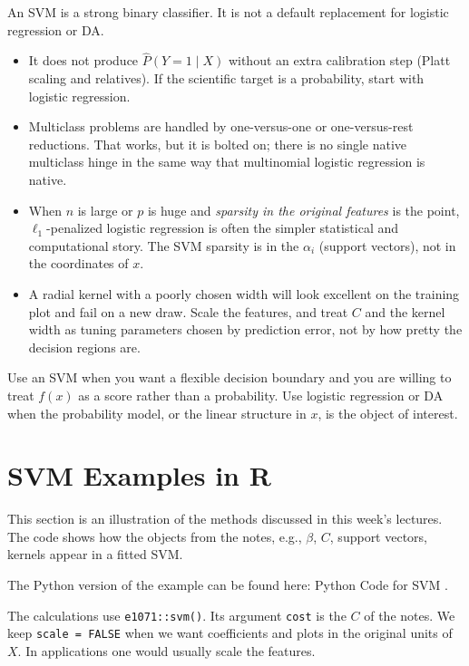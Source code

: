 \documentclass[
]{book}
\providecommand{\tightlist}{%
  \setlength{\itemsep}{0pt}\setlength{\parskip}{0pt}}
\begin{document}
An SVM is a strong binary classifier. It is not a default replacement for logistic regression or DA.

\begin{itemize}
\tightlist
\item
  It does not produce \(\widehat{P}(Y=1\mid X)\) without an extra calibration step (Platt scaling and relatives). If the scientific target is a probability, start with logistic regression.
\item
  Multiclass problems are handled by one-versus-one or one-versus-rest reductions. That works, but it is bolted on; there is no single native multiclass hinge in the same way that multinomial logistic regression is native.
\item
  When \(n\) is large or \(p\) is huge and \emph{sparsity in the original features} is the point, \(\ell_1\)-penalized logistic regression is often the simpler statistical and computational story. The SVM sparsity is in the \(\alpha_i\) (support vectors), not in the coordinates of \(x\).
\item
  A radial kernel with a poorly chosen width will look excellent on the training plot and fail on a new draw. Scale the features, and treat \(C\) and the kernel width as tuning parameters chosen by prediction error, not by how pretty the decision regions are.
\end{itemize}

Use an SVM when you want a flexible decision boundary and you are willing to treat \(f(x)\) as a score rather than a probability. Use logistic regression or DA when the probability model, or the linear structure in \(x\), is the object of interest.

\section{SVM Examples in R}\label{svm-examples-in-r}

This section is an illustration of the methods discussed in this week's lectures. The code shows how the objects from the notes, e.g., \(\beta\), \(C\), support vectors, kernels appear in a fitted SVM.

The Python version of the example can be found here: Python Code for SVM .~

The calculations use \texttt{e1071::svm()}. Its argument \texttt{cost} is the \(C\) of the notes. We keep \texttt{scale\ =\ FALSE} when we want coefficients and plots in the original units of \(X\). In applications one would usually scale the features.
\end{document}

